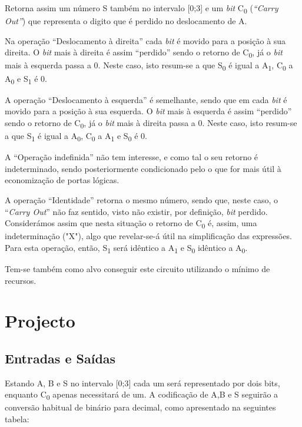 \documentclass[a4paper,12pt]{article}
\begin{document}
Retorna assim um número S também no intervalo [0;3] e um {\it bit} C\textsubscript{0} ({\it ``Carry Out''}) que representa o digito que é perdido no deslocamento de A. 
\par
Na operação ``Deslocamento à direita'' cada {\it bit} é movido para a posição à sua direita. O {\it bit} mais à direita é assim ``perdido'' sendo o retorno de C\textsubscript{0}, já o {\it bit} mais à esquerda passa a 0. Neste caso, isto resum-se a que S\textsubscript{0} é igual a A\textsubscript{1}, C\textsubscript{0} a A\textsubscript{0} e S\textsubscript{1} é 0.
\par
A operação ``Deslocamento à esquerda'' é semelhante, sendo que em cada {\it bit} é movido para a posição à sua esquerda. O {\it bit} mais à esquerda é assim ``perdido'' sendo o retorno de C\textsubscript{0}, já o {\it bit} mais à direita passa a 0. Neste caso, isto resum-se a que S\textsubscript{1} é igual a A\textsubscript{0}, C\textsubscript{0} a A\textsubscript{1} e S\textsubscript{0} é 0.
\par
A ``Operação indefinida'' não tem interesse, e como tal o seu retorno é indeterminado, sendo posteriormente condicionado pelo o que for mais útil à economização de portas lógicas. 
\par
A operação ``Identidade'' retorna o mesmo número, sendo que, neste caso, o ``{\it Carry Out}'' não faz sentido, visto não existir, por definição, {\it bit} perdido. Considerámos assim que nesta situação o retorno de C\textsubscript{0} é, assim, uma indeterminação ("X"), algo que revelar-se-á útil na simplificação das expressões. Para esta operação, então, S\textsubscript{1} será idêntico a A\textsubscript{1} e S\textsubscript{0} idêntico a A\textsubscript{0}.
\par

Tem-se também como alvo conseguir este circuito utilizando o mínimo de recursos.

\section{Projecto}

\subsection{Entradas e Saídas}
Estando A, B e S no intervalo [0;3] cada um será representado por dois bits, enquanto C\textsubscript{0} apenas necessitará de um. A codificação de A,B e S seguirão a conversão habitual de binário para decimal, como apresentado na seguintes tabela:
 
\end{document}
